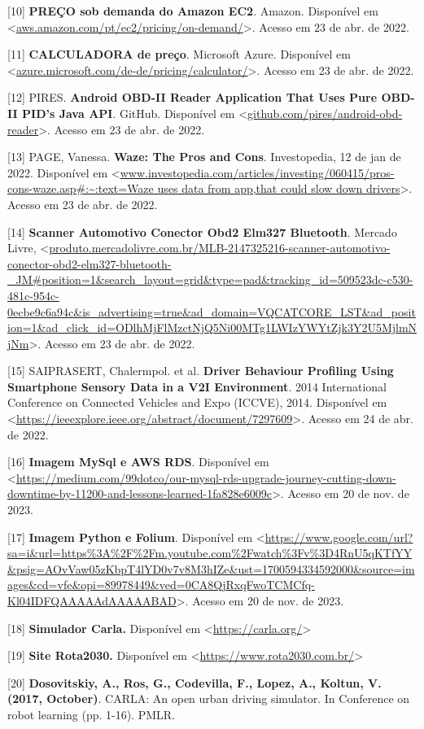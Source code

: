 [10] \textbf{PREÇO sob demanda do Amazon EC2}. Amazon. Disponível em <\url{aws.amazon.com/pt/ec2/pricing/on-demand/}>. Acesso em 23 de abr. de 2022.


[11] \textbf{CALCULADORA de preço}. Microsoft Azure. Disponível em <\url{azure.microsoft.com/de-de/pricing/calculator/}>. Acesso em 23 de abr. de 2022.

[12] PIRES. \textbf{Android OBD-II Reader Application That Uses Pure OBD-II PID's Java API}. GitHub. Disponível em <\url{github.com/pires/android-obd-reader}>. Acesso em 23 de abr. de 2022.

[13] PAGE, Vanessa. \textbf{Waze: The Pros and Cons}. Investopedia, 12 de jan de 2022. Disponível em <\url{www.investopedia.com/articles/investing/060415/pros-cons-waze.asp#:~:text=Waze uses data from app,that could slow down drivers}>. Acesso em 23 de abr. de 2022.


[14] \textbf{Scanner Automotivo Conector Obd2 Elm327 Bluetooth}. Mercado Livre, <\url{produto.mercadolivre.com.br/MLB-2147325216-scanner-automotivo-conector-obd2-elm327-bluetooth-_JM#position=1&search_layout=grid&type=pad&tracking_id=509523dc-c530-481c-954c-0ecbe9c6a94c&is_advertising=true&ad_domain=VQCATCORE_LST&ad_position=1&ad_click_id=ODlhMjFlMzctNjQ5Ni00MTg1LWIzYWYtZjk3Y2U5MjlmNjNm}>. Acesso em 23 de abr. de 2022.

[15] SAIPRASERT, Chalermpol. et al. \textbf{Driver Behaviour Profiling Using Smartphone Sensory Data in a V2I Environment}. 2014 International Conference on Connected Vehicles and Expo (ICCVE), 2014. Disponível em <\url{https://ieeexplore.ieee.org/abstract/document/7297609}>. Acesso em 24 de abr. de 2022.

[16] \textbf{Imagem MySql e AWS RDS}. Disponível em <\url{https://medium.com/99dotco/our-mysql-rds-upgrade-journey-cutting-down-downtime-by-11200-and-lessons-learned-1fa828e6009c}>. Acesso em 20 de nov. de 2023.

[17] \textbf{Imagem Python e Folium}. Disponível em <\url{https://www.google.com/url?sa=i&url=https%3A%2F%2Fm.youtube.com%2Fwatch%3Fv%3D4RnU5qKTfYY&psig=AOvVaw05zKbpT4lYD0v7v8M3hIZe&ust=1700594334592000&source=images&cd=vfe&opi=89978449&ved=0CA8QjRxqFwoTCMCfq-Kl04IDFQAAAAAdAAAAABAD}>. Acesso em 20 de nov. de 2023.

[18] \textbf{Simulador Carla.} Disponível em <\url{https://carla.org/}>

[19] \textbf{Site Rota2030.} Disponível em <\url{https://www.rota2030.com.br/}>

[20] \textbf{Dosovitskiy, A., Ros, G., Codevilla, F., Lopez, A., Koltun, V. (2017, October)}. CARLA: An open urban driving simulator. In Conference on robot learning (pp. 1-16). PMLR.

